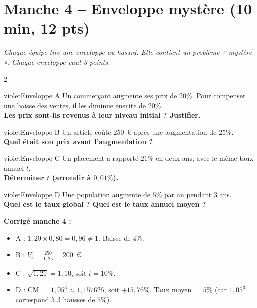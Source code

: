 \documentclass[12pt,a4paper]{article}
\begin{document}
\newpage

\section*{Manche 4 -- Enveloppe mystère (10 min, 12 pts)}

\textit{Chaque équipe tire une enveloppe au hasard. Elle contient un problème « mystère ». Chaque enveloppe vaut 3 points.}

\vspace{0.3cm}

\begin{multicols}{2}

\begin{carte}{violet}{Enveloppe A}
Un commerçant augmente ses prix de \(20\%\). Pour compenser une baisse des ventes, il les diminue ensuite de \(20\%\).\\[0.2cm]
\textbf{Les prix sont-ils revenus à leur niveau initial ? Justifier.}
\end{carte}

\begin{carte}{violet}{Enveloppe B}
Un article coûte \(250\)~\euro{} après une augmentation de \(25\%\).\\[0.2cm]
\textbf{Quel était son prix avant l’augmentation ?}
\end{carte}

\begin{carte}{violet}{Enveloppe C}
Un placement a rapporté \(21\%\) en deux ans, avec le même taux annuel \(t\).\\[0.2cm]
\textbf{Déterminer \(t\) (arrondir à \(0{,}01\%\)).}
\end{carte}

\begin{carte}{violet}{Enveloppe D}
Une population augmente de \(5\%\) par an pendant 3 ans.\\[0.2cm]
\textbf{Quel est le taux global ? Quel est le taux annuel moyen ?}
\end{carte}

\end{multicols}

\vspace{0.3cm}
\textbf{Corrigé manche 4 :}
\begin{itemize}
    \item A : \(1{,}20 \times 0{,}80 = 0{,}96 \neq 1\). Baisse de \(4\%\).
    \item B : \(V_i = \frac{250}{1{,}25} = 200\)~\euro{}.
    \item C : \(\sqrt{1{,}21} = 1{,}10\), soit \(t = 10\%\).
    \item D : CM \(= 1{,}05^3 \approx 1{,}157625\), soit \(+15{,}76\%\). Taux moyen \(= 5\%\) (car \(1{,}05^3\) correspond à 3 hausses de \(5\%\)).
\end{itemize}
\end{document}
